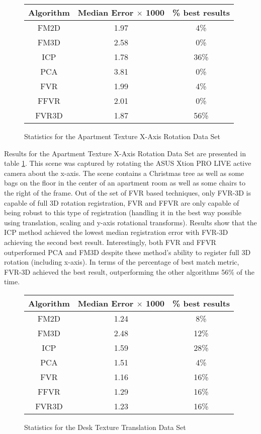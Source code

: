 \begin{figure}
\centering
\begin{tabular}{ccc}
\hline
\textbf{Algorithm} & \textbf{Median Error $\times$ 1000} & \textbf{\% best results}\\ \hline
FM2D	& 1.97 & 4\%\\
FM3D	& 2.58 & 0\%\\
ICP	& 1.78 & 36\%\\
PCA	& 3.81 & 0\%\\
FVR	& 1.99 & 4\%\\
FFVR	& 2.01 & 0\%\\
FVR3D	& 1.87 & 56\%\\
\end{tabular}
\caption{Statistics for the Apartment Texture X-Axis Rotation Data Set}
\label{tab:apartmenttexturex-axisrotation}
\end{figure} 

Results for the Apartment Texture X-Axis Rotation Data Set are presented in table \ref{tab:apartmenttexturex-axisrotation}. This scene was captured by rotating the ASUS Xtion PRO LIVE active camera about the x-axis. The scene contains a Christmas tree as well as some bags on the floor in the center of an apartment room as well as some chairs to the right of the frame. Out of the set of FVR based techniques, only FVR-3D is capable of full 3D rotation registration, FVR and FFVR are only capable of being robust to this type of registration (handling it in the best way possible using translation, scaling and y-axis rotational transforms). Results show that the ICP method achieved the lowest median registration error with FVR-3D achieving the second best result. Interestingly, both FVR and FFVR outperformed PCA and FM3D despite these method's ability to register full 3D rotation (including x-axis). In terms of the percentage of best match metric, FVR-3D achieved the best result, outperforming the other algorithms 56\% of the time. \\

\begin{figure}
\centering
\begin{tabular}{ccc}
\hline
\textbf{Algorithm} & \textbf{Median Error $\times$ 1000} & \textbf{\% best results}\\ \hline
FM2D	& 1.24 & 8\%\\
FM3D	& 2.48 & 12\%\\
ICP	& 1.59 & 28\%\\
PCA	& 1.51 & 4\%\\
FVR	& 1.16 & 16\%\\
FFVR	& 1.29 & 16\%\\
FVR3D	& 1.23 & 16\%\\
\end{tabular}
\caption{Statistics for the Desk Texture Translation Data Set}
\label{tab:desktexturetranslation}
\end{figure} 


